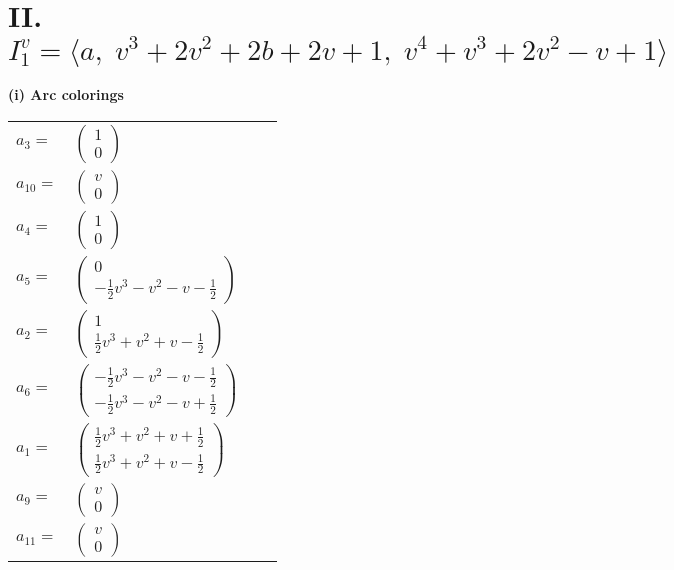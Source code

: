 \documentclass[1p]{elsarticle_modified}
\theoremstyle{definition}
\begin{document}
\centering \section*{II. $I^v_{1}= \langle a,\;v^3+2 v^2+2 b+2 v+1,\;v^4+v^3+2 v^2- v+1 \rangle$}
\flushleft \textbf{(i) Arc colorings}\\
\begin{tabular}{m{7pt} m{180pt} m{7pt} m{180pt} }
\flushright $a_{3}=$&$\begin{pmatrix}1\\0\end{pmatrix}$ \\
\flushright $a_{10}=$&$\begin{pmatrix}v\\0\end{pmatrix}$ \\
\flushright $a_{4}=$&$\begin{pmatrix}1\\0\end{pmatrix}$ \\
\flushright $a_{5}=$&$\begin{pmatrix}0\\-\frac{1}{2} v^3- v^2- v-\frac{1}{2}\end{pmatrix}$ \\
\flushright $a_{2}=$&$\begin{pmatrix}1\\\frac{1}{2} v^3+v^2+v-\frac{1}{2}\end{pmatrix}$ \\
\flushright $a_{6}=$&$\begin{pmatrix}-\frac{1}{2} v^3- v^2- v-\frac{1}{2}\\-\frac{1}{2} v^3- v^2- v+\frac{1}{2}\end{pmatrix}$ \\
\flushright $a_{1}=$&$\begin{pmatrix}\frac{1}{2} v^3+v^2+v+\frac{1}{2}\\\frac{1}{2} v^3+v^2+v-\frac{1}{2}\end{pmatrix}$ \\
\flushright $a_{9}=$&$\begin{pmatrix}v\\0\end{pmatrix}$ \\
\flushright $a_{11}=$&$\begin{pmatrix}v\\0\end{pmatrix}$ \\

\end{tabular}
\end{document}

